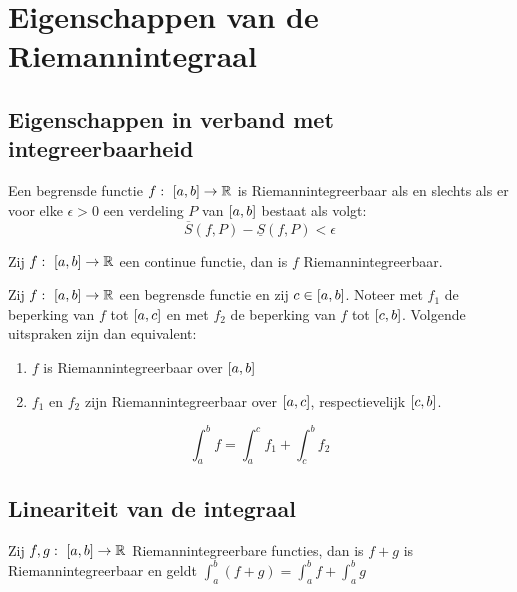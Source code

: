 \documentclass[main.tex]{subfiles}
\begin{document}
\section{Eigenschappen van de Riemannintegraal}
\label{sec:eigenschappen-van-de}

\subsection{Eigenschappen in verband met integreerbaarheid}
\label{sec:eigensch-verb-met}

\begin{bpr}
  Een begrensde functie $f:\ \interval{a}{b} \rightarrow \mathbb{R}$ is Riemannintegreerbaar als en slechts als er voor elke $\epsilon > 0$ een verdeling $P$ van $\interval{a}{b}$ bestaat als volgt:
  \[ \overline{S}(f,P) - \underline{S}(f,P) < \epsilon \]
\end{bpr}

\begin{bpr}
  Zij $f:\ \interval{a}{b} \rightarrow \mathbb{R}$ een continue functie, dan is $f$ Riemannintegreerbaar.
\end{bpr}

\begin{bpr}
  Zij $f:\ \interval{a}{b} \rightarrow \mathbb{R}$ een begrensde functie en zij $c\in \interval{a}{b}$.
  Noteer met $f_{1}$ de beperking van $f$ tot $\interval{a}{c}$ en met $f_{2}$ de beperking van $f$ tot $\interval{c}{b}$.
  Volgende uitspraken zijn dan equivalent:
  \begin{enumerate}
  \item $f$ is Riemannintegreerbaar over $\interval{a}{b}$
  \item $f_{1}$ en $f_{2}$ zijn Riemannintegreerbaar over $\interval{a}{c}$, respectievelijk $\interval{c}{b}$.
  \end{enumerate}
  \[ \int_{a}^{b}f = \int_{a}^{c}f_{1} + \int_{c}^{b}f_{2} \]
\end{bpr}

\subsection{Lineariteit van de integraal}
\label{sec:lineariteit-van-de}

\begin{bpr}
  Zij $f,g:\ \interval{a}{b} \rightarrow \mathbb{R}$ Riemannintegreerbare functies, dan is $f+g$ is Riemannintegreerbaar en geldt $\int_{a}^{b}(f+g) = \int_{a}^{b}f + \int_{a}^{b}g$
\end{bpr}
\end{document}
